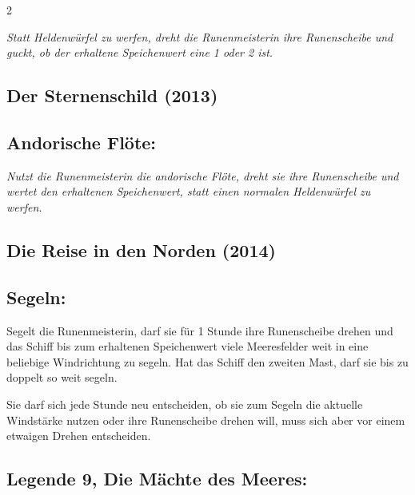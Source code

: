 \documentclass[10pt, a4paper, oneside]{book}
\newcommand{\fan}[1]{\textit{#1}}
\begin{document}
\begin{multicols*}{2}
\begin{bgcolor}
\fan{Statt Heldenwürfel zu werfen, dreht die Runenmeisterin ihre Runenscheibe und guckt, ob der erhaltene Speichenwert eine 1 oder 2 ist.}

\end{bgcolor}






\begin{bgcolor}
\section{Der Sternenschild (2013)}

\subsection{Andorische Flöte:}

\fan{Nutzt die Runenmeisterin die andorische Flöte, dreht sie ihre Runenscheibe und wertet den erhaltenen Speichenwert, statt einen normalen Heldenwürfel zu werfen.}

\end{bgcolor}




\columnbreak



\begin{bgcolor}
\section{Die Reise in den Norden (2014)}

\subsection{Segeln:}

Segelt die Runenmeisterin, darf sie für 1 Stunde ihre Runenscheibe drehen und das Schiff bis\supercite{90045} zum erhaltenen Speichenwert viele Meeresfelder weit in eine beliebige Windrichtung zu segeln.
\supercite{mh-runen,mh-begleitheft}
Hat das Schiff den zweiten Mast, darf sie bis zu doppelt so weit segeln.
\supercite{90070}

Sie darf sich jede Stunde neu entscheiden, ob sie zum Segeln die aktuelle Windstärke nutzen oder ihre Runenscheibe drehen will, muss sich aber vor einem etwaigen Drehen entscheiden.
\supercite{88563}



\subsection{Legende 9, Die Mächte des Meeres:}


\end{bgcolor}
\end{multicols*}
\end{document}
